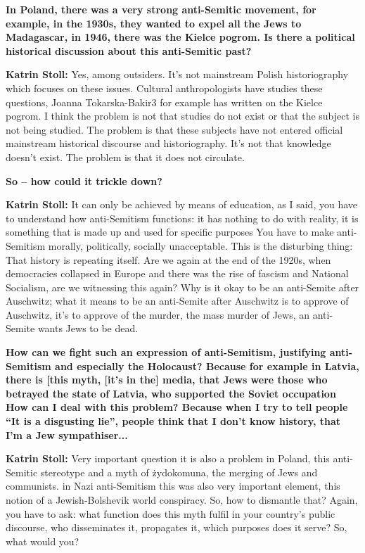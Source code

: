 \textbf{In Poland, there was a very strong anti-Semitic movement, for example, in the 1930s, they wanted to expel all the Jews to Madagascar, in 1946, there was the Kielce pogrom. Is there a political historical discussion about this anti-Semitic past?} 

\textbf{Katrin Stoll:} Yes, among outsiders. It’s not mainstream Polish historiography which focuses on these issues. Cultural anthropologists have studies these questions, Joanna Tokarska-Bakir3 for example has written on the Kielce pogrom. I think the problem is not that studies do not exist or that the subject is not being studied. The problem is that these subjects have not entered official mainstream historical discourse and historiography. It’s not that knowledge doesn’t exist. The problem is that it does not circulate.  

\textbf{So – how could it trickle down?}

\textbf{Katrin Stoll:} It can only be achieved by means of education, as I said, you have to understand how anti-Semitism functions: it has nothing to do with reality, it is something that is made up and used for specific purposes You have to make anti-Semitism morally, politically, socially unacceptable. This is the disturbing thing: That history is repeating itself. Are we again at the end of the 1920s, when democracies collapsed in Europe and there was the rise of fascism and National Socialism, are we witnessing this again?  Why is it okay to be an anti-Semite after Auschwitz; what it means to be an anti-Semite after Auschwitz is to approve of Auschwitz, it’s to approve of the murder, the mass murder of Jews, an anti-Semite wants Jews to be dead.  

\textbf{How can we fight such an expression of anti-Semitism, justifying anti-Semitism and especially the Holocaust? Because for example in Latvia, there is [this myth, [it’s in the] media, that Jews were those who betrayed the state of Latvia, who supported the Soviet occupation How can I deal with this problem? Because when I try to tell people “It is a disgusting lie”, people think that I don’t know history, that I’m a Jew sympathiser...}

\textbf{Katrin Stoll:} Very important question it is also a problem in Poland, this anti-Semitic stereotype and a myth of żydokomuna, the merging of Jews and communists.  in Nazi anti-Semitism this was also very important element, this notion of a Jewish-Bolshevik world conspiracy. So, how to dismantle that? Again, you have to ask: what function does this myth fulfil in your country’s public discourse, who disseminates it, propagates it, which purposes does it serve? So, what would you? 

